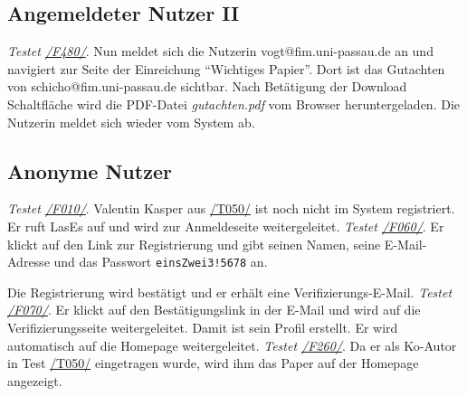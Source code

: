 \subsection{Angemeldeter Nutzer II}

\begin{description}

	 \emph{Testet \hyperref[funkt:480]{/F480/}}.
	Nun meldet sich die Nutzerin vogt@fim.uni-passau.de an und navigiert zur Seite der Einreichung ``Wichtiges Papier''.
	Dort ist das Gutachten von schicho@fim.uni-passau.de sichtbar. Nach Betätigung der Download Schaltfläche wird die PDF-Datei \emph{gutachten.pdf} vom Browser heruntergeladen.
	Die Nutzerin meldet sich wieder vom System ab.

\end{description}

\subsection{Anonyme Nutzer}

\begin{description}
	 \emph{Testet \hyperref[funkt:010]{/F010/}}. Valentin Kasper aus \hyperref[t050]{/T050/} ist noch nicht im System registriert.
	Er ruft LasEs auf und wird zur Anmeldeseite weitergeleitet.
	 \emph{Testet \hyperref[funkt:060]{/F060/}}. Er klickt auf den Link zur Registrierung und gibt seinen Namen, seine E-Mail-Adresse und das Passwort \texttt{einsZwei3!5678} an.

	Die Registrierung wird bestätigt und er erhält eine Verifizierungs-E-Mail.
	 \emph{Testet \hyperref[funkt:070]{/F070/}}. Er klickt auf den Bestätigungslink in der E-Mail und wird auf die Verifizierungsseite weitergeleitet.
	Damit ist sein Profil erstellt.
	Er wird automatisch auf die Homepage weitergeleitet.
	 \emph{Testet \hyperref[funkt:260]{/F260/}}. Da er als Ko-Autor in Test \hyperref[t050]{/T050/} eingetragen wurde, wird ihm das Paper auf der Homepage angezeigt.
\end{description}

